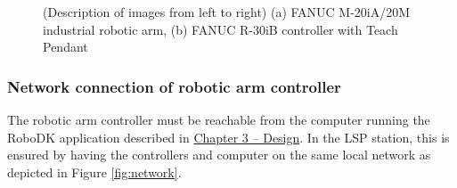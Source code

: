 \begin{figure}[H]
\begin{center}
  \hspace{1cm}
  \caption[Časové odezvy virtuálního modelu vodní nádrže]
    {(Description of images from left to right) (a) FANUC M-20iA/20M industrial robotic arm, (b) FANUC R-30iB controller with Teach Pendant \cite{fanucrobotcontroller}}
  \label{fig:fanucrobot}
\end{center}
\end{figure}


\subsubsection*{Network connection of robotic arm controller}


The robotic arm controller must be reachable from the computer running the RoboDK application described in \hyperref[chap:design]{Chapter 3 -- Design}. In the LSP station, this is ensured by having the controllers and computer on the same local network as depicted in Figure \ref{fig:network}. 

